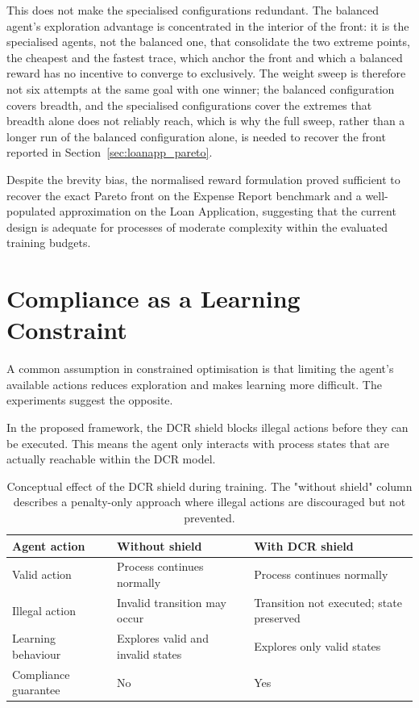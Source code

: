This does not make the specialised configurations redundant. The balanced agent's exploration advantage is concentrated in the interior of the front: it is the specialised agents, not the balanced one, that consolidate the two extreme points, the cheapest and the fastest trace, which anchor the front and which a balanced reward has no incentive to converge to exclusively. The weight sweep is therefore not six attempts at the same goal with one winner; the balanced configuration covers breadth, and the specialised configurations cover the extremes that breadth alone does not reliably reach, which is why the full sweep, rather than a longer run of the balanced configuration alone, is needed to recover the front reported in Section~\ref{sec:loanapp_pareto}.

Despite the brevity bias, the normalised reward formulation proved sufficient to recover the exact Pareto front on the Expense Report benchmark and a well-populated approximation on the Loan Application, suggesting that the current design is adequate for processes of moderate complexity within the evaluated training budgets.

\section{Compliance as a Learning Constraint}
\label{sec:discussion_compliance}

A common assumption in constrained optimisation is that limiting the agent's available actions reduces exploration and makes learning more difficult. The experiments suggest the opposite.

In the proposed framework, the \ac{DCR} shield blocks illegal actions before they can be executed. This means the agent only interacts with process states that are actually reachable within the \ac{DCR} model.

\begin{table}[H]
\centering
\caption{{Conceptual effect of the DCR shield during training. The "without shield" column describes a penalty-only approach where illegal actions are discouraged but not prevented.}}
\label{tab:shield_effect}
\renewcommand{\arraystretch}{1.4}
\begin{tabular}{p{5cm} p{4.5cm} p{4.5cm}}
\toprule
\textbf{Agent action} & \textbf{Without shield} & \textbf{With DCR shield} \\
\midrule
Valid action &
Process continues normally &
Process continues normally \\

Illegal action &
Invalid transition may occur &
Transition not executed; state preserved \\

Learning behaviour &
Explores valid and invalid states &
Explores only valid states \\

Compliance guarantee &
No &
Yes \\

\bottomrule
\end{tabular}
\end{table}

